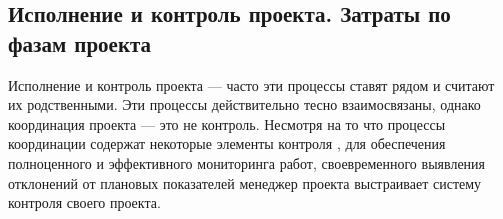 \subsection{Исполнение и контроль проекта. Затраты по фазам проекта}

Исполнение и контроль проекта --- часто эти процессы ставят рядом и считают их родственными.
Эти процессы действительно тесно взаи­мосвязаны, однако координация проекта --- это не контроль.
Несмотря на то что процессы координации содержат некоторые элементы конт­роля , для обеспечения полноценного и эффективного мониторинга работ, своевременного выявления отклонений от плановых показателей менеджер проекта выстраивает систему контроля своего проекта.